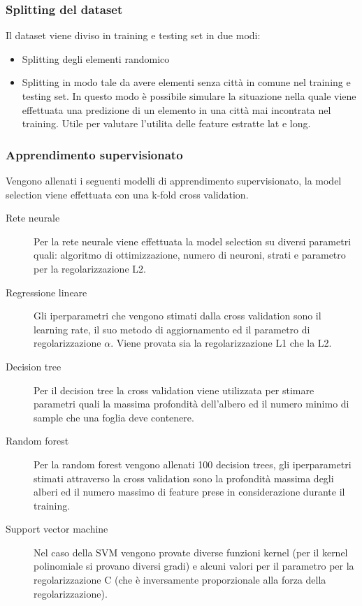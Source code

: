 \documentclass{beamer}
\begin{document}
\begin{frame}
	\frametitle{Splitting del dataset}
	Il dataset viene diviso in training e testing set in due modi:
	\begin{itemize}
		\item Splitting degli elementi randomico
		\item Splitting in modo tale da avere elementi senza città in comune nel
			training e testing set. In questo modo è possibile simulare la
			situazione nella quale viene effettuata una predizione di un
			elemento in una città mai incontrata nel training. Utile per valutare
			l'utilita delle feature estratte \alert{lat} e \alert{long}.
	\end{itemize}
\end{frame}

\begin{frame}
	\frametitle{Apprendimento supervisionato}
	\fontsize{8pt}{10}
	Vengono allenati i seguenti modelli di apprendimento supervisionato, la
	model selection viene effettuata con una k-fold cross validation.
	\begin{description}
	\item[Rete neurale]
	Per la rete neurale viene effettuata la model selection su diversi parametri
	quali: algoritmo di ottimizzazione, numero di neuroni, strati e parametro per
	la regolarizzazione L2.
	\item[Regressione lineare]
	Gli iperparametri che vengono stimati dalla cross validation sono il learning
	rate, il suo metodo di aggiornamento ed il parametro di regolarizzazione
	$\alpha$. Viene provata sia la regolarizzazione L1 che la L2.
	\item[Decision tree]
	Per il decision tree la cross validation viene utilizzata per stimare parametri
	quali la massima profondità dell'albero ed il numero minimo di sample che una
	foglia deve contenere.
	\item[Random forest]
	Per la random forest vengono allenati 100 decision trees, gli iperparametri
	stimati attraverso la cross validation sono la profondità massima degli alberi
	ed il numero massimo di feature prese in considerazione durante il training.
	\item[Support vector machine]
	Nel caso della SVM vengono provate diverse funzioni kernel (per il kernel
	polinomiale si provano diversi gradi) e alcuni valori per il parametro per la
	regolarizzazione C (che è inversamente proporzionale alla forza della
	regolarizzazione).
	\end{description}
\end{frame}
\end{document}
